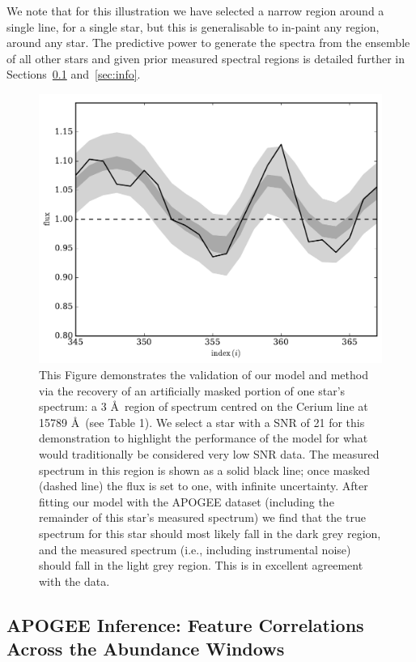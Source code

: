 \documentclass[a4paper,fleqn,usenatbib]{mnras}
\begin{document}
We note that for this illustration we have selected a narrow region around a single line, for a single star, but this is generalisable to in-paint any region, around any star. The predictive power to generate the spectra from the ensemble of all other stars and given prior measured spectral regions is detailed further in Sections~\ref{sec:inference} and~\ref{sec:info}. 


\begin{figure}
	\includegraphics[width=\columnwidth]{apogee_centers_final_29502_spc_rec_test_recovery_zoom.pdf}
    \caption{This Figure demonstrates the validation of our model and method via the recovery of an artificially masked portion of one star's spectrum: a 3 \AA\ region of spectrum centred on the Cerium line at 15789 \AA\ (see Table 1). We select a star with a SNR of 21 for this demonstration to highlight the performance of the model for what would traditionally be considered very low SNR data. The measured spectrum in this region is shown as a solid black line; once masked (dashed line) the flux is set to one, with infinite uncertainty. After fitting our model with the APOGEE dataset (including the remainder of this star's measured spectrum) we find that the true spectrum for this star should most likely fall in the dark grey region, and the measured spectrum (i.e., including instrumental noise) should fall in the light grey region. This is in excellent agreement with the data.}
    \label{fig:recovery_test}
\end{figure}

\subsection{APOGEE Inference: Feature Correlations Across the Abundance Windows}
\label{sec:inference}
\end{document}
